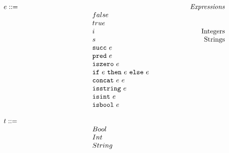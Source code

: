 \documentclass[addpoints]{exam}
\begin{document}
\newcommand{\mydefhead}[2]{\multicolumn{2}{l}{{#1}}&\mbox{\emph{#2}}\\}
\newcommand{\mydefcase}[2]{\qquad\qquad\qquad\qquad\qquad\qquad& #1 &\mbox{#2}\\}

\newcommand{\setexp}[2]{\mbox{\tt set}~#1~#2}
\newcommand{\readexp}[1]{\mbox{\tt read}~#1}
\newcommand{\loopexp}[2]{\mbox{\tt loop}~#1~#2}
\newcommand{\incexp}[1]{\mbox{\tt inc}~{#1}}
\newcommand{\testexp}[2]{\mbox{\tt test}~{#1}~{#2}}
\newcommand{\thenexp}[2]{#1~\mbox{\tt then}~{#2}}
\newcommand{\crashexp}{\mbox{\tt crash}}
\newcommand{\rel}[1]{ \mbox{\sc [#1]} }
\newcommand{\sstep}[2]{{#1} \rightarrow {#2}}
\newcommand{\bstep}[2]{{#1} \Downarrow {#2}}
\newcommand{\tstep}[2]{{#1} \colon {#2}}

\newcommand{\ssrule}[3]{
  \rel{#1} &
  \frac{\strut\begin{array}{@{}c@{}} #2 \end{array}}
       {\strut\begin{array}{@{}c@{}} #3 \end{array}}
   \\~\\
}

\newcommand{\Esucc}[1]{\mbox{\tt succ}~#1}
\newcommand{\Epred}[1]{\mbox{\tt pred}~#1}
\newcommand{\Eiszero}[1]{\mbox{\tt iszero}~#1}
\newcommand{\Econcat}[2]{\mbox{\tt concat}~{#1}~{#2}}
\newcommand{\Eisstring}[1]{\mbox{\tt isstring}~#1}
\newcommand{\Eisint}[1]{\mbox{\tt isint}~#1}
\newcommand{\Eisbool}[1]{\mbox{\tt isbool}~#1}
\newcommand{\ife}[3]{\mbox{\tt if}~{#1}~\mbox{\tt then}~{#2}~\mbox{\tt else}~{#3}}
\newcommand{\true}{\mbox{\tt true}}
\newcommand{\false}{\mbox{\tt false}}

\[
  \begin{array}{ll@{\qquad\qquad\qquad}r}
  \mydefhead{e ::=}{Expressions}
    \mydefcase{false}{}
    \mydefcase{true}{}
    \mydefcase{i}{Integers}
    \mydefcase{s}{Strings}
    \mydefcase{\Esucc{e}}{}
    \mydefcase{\Epred{e}}{}
    \mydefcase{\Eiszero{e}}{}
    \mydefcase{\ife e e e}{}
    \mydefcase{\Econcat{e}{e}}{}
    \mydefcase{\Eisstring{e}}{}
    \mydefcase{\Eisint{e}}{}
    \mydefcase{\Eisbool{e}}{}
  \\
  \mydefhead{t ::=}{}
    \mydefcase{Bool}{}
    \mydefcase{Int}{}
    \mydefcase{String}{}
  \\
\end{array}
\]
\end{document}
